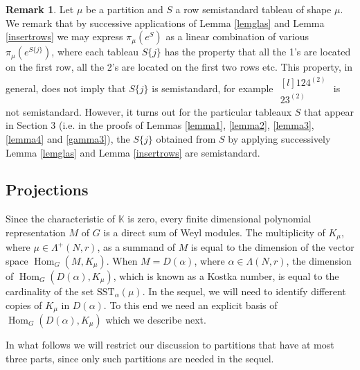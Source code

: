 \documentclass[11pt]{amsart}
\theoremstyle{definition}
\newtheorem{rem}[thm]{Remark}
\numberwithin{equation}{section}
\DeclareMathOperator{\Hom}{Hom}
\begin{document}
		\begin{rem}Let $\mu$ be a partition and $S$ a row semistandard tableau of shape $\mu$. We remark that by successive applications of Lemma \ref{lemglas} and Lemma \ref{insertrows} we may express $\pi_\mu(e^S)$ as a linear combination of various $\pi_\mu(e^{S\{j\}})$, where each tableau $S\{j\}$ has the property that all the 1's are located on the first row, all the 2's are located on the first two rows etc. This property, in general, does not imply that $S\{j\}$ is semistandard, for example $\begin{matrix*}[l] 
				124^{(2)} \\
				23^{(2)} \end{matrix*}$ is not semistandard.  However, it  turns out for the particular tableaux $S$ that appear in Section 3 (i.e. in the proofs of Lemmas \ref{lemma1}, \ref{lemma2}, \ref{lemma3}, \ref{lemma4} and \ref{gamma3}), the $S\{j\}$ obtained from $S$ by applying successively Lemma \ref{lemglas} and Lemma \ref{insertrows} are semistandard.  \end{rem}
\subsection{Projections} Since the characteristic of $\mathbb{K}$ is zero, every finite dimensional polynomial representation $M$ of $G$ is a direct sum of Weyl modules. The multiplicity of $K_\mu$, where $\mu \in \Lambda^+(N,r)$, as a summand of $M$ is equal to the dimension of the vector space $\Hom_G(M,K_\mu)$. When $M=D(\alpha)$, where $\alpha \in \Lambda(N,r)$, the dimension of $\Hom_G(D(\alpha),K_\mu)$, which is known as a Kostka number, is equal to the cardinality of the set $\mathrm{SST}_\alpha (\mu)$. In the sequel, we will need to identify different copies of $K_\mu$ in $D(\alpha)$. To this end we need an explicit basis of $\Hom_G(D(\alpha),K_\mu)$ which we describe next.


In what follows we will restrict our discussion to partitions that have at most three parts, since only such partitions are needed in the sequel. 
\end{document}
